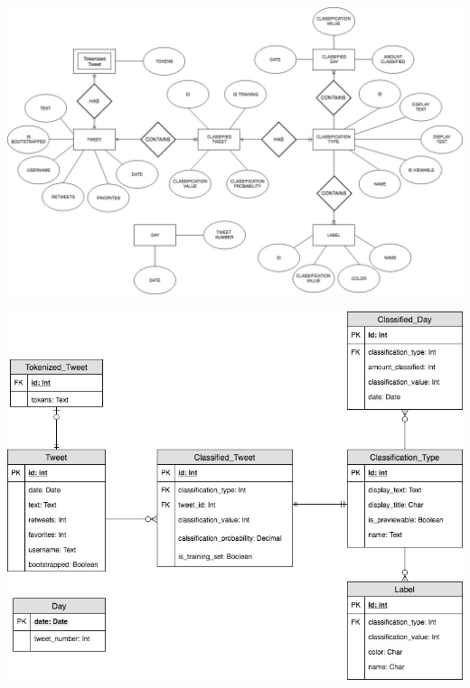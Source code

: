 \documentclass[11pt]{report}
\begin{document}
\begin{landscape} 
\begin{center}
  \includegraphics[width=22cm]{images/conceptual-erd.jpg}
  \label{fig:conceptual-erd}
\end{center}
\end{landscape}

\begin{landscape} 
\begin{center}
  \includegraphics[width=\textwidth]{images/physical-erd.jpg}
  \label{fig:physical-erd}
\end{center}
\end{landscape}
\restoregeometry %
\end{document}
